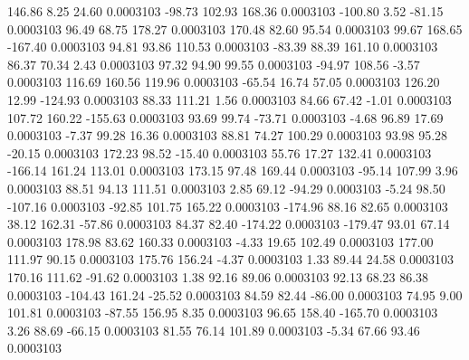       146.86        8.25       24.60     0.0003103
      -98.73      102.93      168.36     0.0003103
     -100.80        3.52      -81.15     0.0003103
       96.49       68.75      178.27     0.0003103
      170.48       82.60       95.54     0.0003103
       99.67      168.65     -167.40     0.0003103
       94.81       93.86      110.53     0.0003103
      -83.39       88.39      161.10     0.0003103
       86.37       70.34        2.43     0.0003103
       97.32       94.90       99.55     0.0003103
      -94.97      108.56       -3.57     0.0003103
      116.69      160.56      119.96     0.0003103
      -65.54       16.74       57.05     0.0003103
      126.20       12.99     -124.93     0.0003103
       88.33      111.21        1.56     0.0003103
       84.66       67.42       -1.01     0.0003103
      107.72      160.22     -155.63     0.0003103
       93.69       99.74      -73.71     0.0003103
       -4.68       96.89       17.69     0.0003103
       -7.37       99.28       16.36     0.0003103
       88.81       74.27      100.29     0.0003103
       93.98       95.28      -20.15     0.0003103
      172.23       98.52      -15.40     0.0003103
       55.76       17.27      132.41     0.0003103
     -166.14      161.24      113.01     0.0003103
      173.15       97.48      169.44     0.0003103
      -95.14      107.99        3.96     0.0003103
       88.51       94.13      111.51     0.0003103
        2.85       69.12      -94.29     0.0003103
       -5.24       98.50     -107.16     0.0003103
      -92.85      101.75      165.22     0.0003103
     -174.96       88.16       82.65     0.0003103
       38.12      162.31      -57.86     0.0003103
       84.37       82.40     -174.22     0.0003103
     -179.47       93.01       67.14     0.0003103
      178.98       83.62      160.33     0.0003103
       -4.33       19.65      102.49     0.0003103
      177.00      111.97       90.15     0.0003103
      175.76      156.24       -4.37     0.0003103
        1.33       89.44       24.58     0.0003103
      170.16      111.62      -91.62     0.0003103
        1.38       92.16       89.06     0.0003103
       92.13       68.23       86.38     0.0003103
     -104.43      161.24      -25.52     0.0003103
       84.59       82.44      -86.00     0.0003103
       74.95        9.00      101.81     0.0003103
      -87.55      156.95        8.35     0.0003103
       96.65      158.40     -165.70     0.0003103
        3.26       88.69      -66.15     0.0003103
       81.55       76.14      101.89     0.0003103
       -5.34       67.66       93.46     0.0003103
